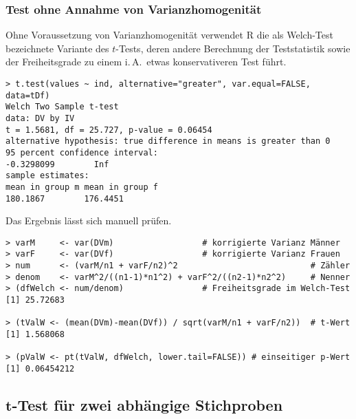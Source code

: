 \subsubsection{Test ohne Annahme von Varianzhomogenität}

Ohne Voraussetzung von Varianzhomogenität verwendet R die als Welch-Test bezeichnete Variante des $t$-Tests, deren andere Berechnung der Teststatistik sowie der Freiheitsgrade zu einem i.\,A.\ etwas konservativeren Test führt.
\begin{lstlisting}
> t.test(values ~ ind, alternative="greater", var.equal=FALSE, data=tDf)
Welch Two Sample t-test
data: DV by IV
t = 1.5681, df = 25.727, p-value = 0.06454
alternative hypothesis: true difference in means is greater than 0
95 percent confidence interval:
-0.3298099        Inf
sample estimates:
mean in group m mean in group f
180.1867        176.4451
\end{lstlisting}

Das Ergebnis lässt sich manuell prüfen.
\begin{lstlisting}
> varM     <- var(DVm)                  # korrigierte Varianz Männer
> varF     <- var(DVf)                  # korrigierte Varianz Frauen
> num      <- (varM/n1 + varF/n2)^2                           # Zähler
> denom    <- varM^2/((n1-1)*n1^2) + varF^2/((n2-1)*n2^2)     # Nenner
> (dfWelch <- num/denom)                # Freiheitsgrade im Welch-Test
[1] 25.72683

> (tValW <- (mean(DVm)-mean(DVf)) / sqrt(varM/n1 + varF/n2))  # t-Wert
[1] 1.568068

> (pValW <- pt(tValW, dfWelch, lower.tail=FALSE)) # einseitiger p-Wert
[1] 0.06454212
\end{lstlisting}

\subsection[\texorpdfstring{$t$}{t}-Test für zwei abhängige Stichproben]{$\bm{t}$-Test für zwei abhängige Stichproben}
\label{sec:tTwoDep}


